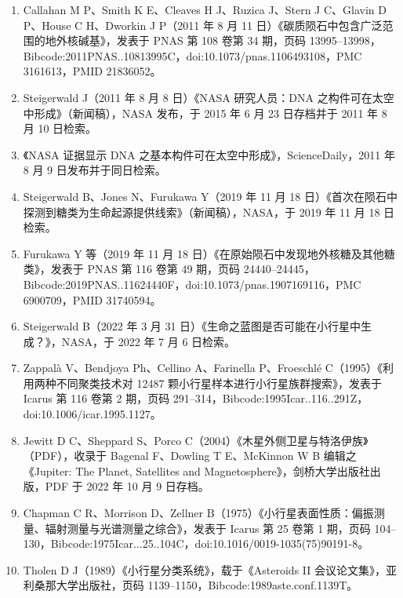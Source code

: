 \begin{enumerate}
\item Callahan M P、Smith K E、Cleaves H J、Ruzica J、Stern J C、Glavin D P、House C H、Dworkin J P（2011 年 8 月 11 日）《碳质陨石中包含广泛范围的地外核碱基》，发表于 PNAS 第 108 卷第 34 期，页码 13995–13998，Bibcode:2011PNAS..10813995C，doi:10.1073/pnas.1106493108，PMC 3161613，PMID 21836052。

\item Steigerwald J（2011 年 8 月 8 日）《NASA 研究人员：DNA 之构件可在太空中形成》（新闻稿），NASA 发布，于 2015 年 6 月 23 日存档并于 2011 年 8 月 10 日检索。

\item 《NASA 证据显示 DNA 之基本构件可在太空中形成》，ScienceDaily，2011 年 8 月 9 日发布并于同日检索。

\item Steigerwald B、Jones N、Furukawa Y（2019 年 11 月 18 日）《首次在陨石中探测到糖类为生命起源提供线索》（新闻稿），NASA，于 2019 年 11 月 18 日检索。

\item Furukawa Y 等（2019 年 11 月 18 日）《在原始陨石中发现地外核糖及其他糖类》，发表于 PNAS 第 116 卷第 49 期，页码 24440–24445，Bibcode:2019PNAS..11624440F，doi:10.1073/pnas.1907169116，PMC 6900709，PMID 31740594。

\item Steigerwald B（2022 年 3 月 31 日）《生命之蓝图是否可能在小行星中生成？》，NASA，于 2022 年 7 月 6 日检索。

\item Zappalà V、Bendjoya Ph、Cellino A、Farinella P、Froeschlé C（1995）《利用两种不同聚类技术对 12487 颗小行星样本进行小行星族群搜索》，发表于 Icarus 第 116 卷第 2 期，页码 291–314，Bibcode:1995Icar..116..291Z，doi:10.1006/icar.1995.1127。

\item Jewitt D C、Sheppard S、Porco C（2004）《木星外侧卫星与特洛伊族》（PDF），收录于 Bagenal F、Dowling T E、McKinnon W B 编辑之《Jupiter: The Planet, Satellites and Magnetosphere》，剑桥大学出版社出版，PDF 于 2022 年 10 月 9 日存档。

\item Chapman C R、Morrison D、Zellner B（1975）《小行星表面性质：偏振测量、辐射测量与光谱测量之综合》，发表于 Icarus 第 25 卷第 1 期，页码 104–130，Bibcode:1975Icar...25..104C，doi:10.1016/0019-1035(75)90191-8。

\item Tholen D J（1989）《小行星分类系统》，载于《Asteroids II 会议论文集》，亚利桑那大学出版社，页码 1139–1150，Bibcode:1989aste.conf.1139T。


\end{enumerate}
